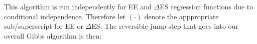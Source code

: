 \documentclass[11pt]{article}\usepackage[]{graphicx}\usepackage[]{color}
\begin{document}

This algorithm is run independently for EE and $\Delta$ES regression functions due to conditional independence. Therefore let $(\cdot)$ denote the apppropriate sub/superscript for EE or $\Delta$ES. The reversible jump step that goes into our overall Gibbs algorithm is then:
\end{document}
